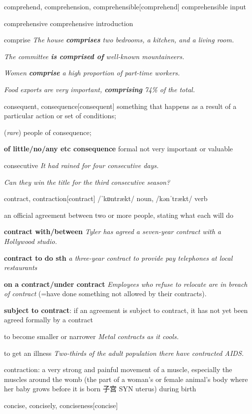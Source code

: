 \begin{word}{comprehend, comprehension, comprehensible}[comprehend]
    comprehensible input
\end{word}

\begin{word}{comprehensive}
    comprehensive introduction
\end{word}

\begin{word}{comprise}
    \textit{The house \textbf{comprises} two bedrooms, a kitchen, and a living room.} 
    
    \textit{The committee \textbf{is comprised of} well-known mountaineers. }
    
    \textit{Women \textbf{comprise} a high proportion of part-time workers.} 
    
    \textit{Food exports are very important, \textbf{comprising} 74\% of the total.}
\end{word}

\begin{word}{consequent, consequence}[consequent]
    something that happens as a result of a particular action or set of conditions; 
    
    (\textit{rare}) people of consequence; 
    
    \textbf{of little/no/any etc consequence} formal not very important or valuable
\end{word}

\begin{word}{consecutive}
   \textit{ It had rained for four consecutive days.}

    \textit{Can they win the title for the third consecutive season?}
\end{word}

\begin{word}{contract, contraction}[contract]
    /ˈkɒntrækt/ noun, /kənˈtrækt/ verb

    an official agreement between two or more people, stating what each will do

    \textbf{contract with/between}
    \textit{Tyler has agreed a seven-year contract with a Hollywood studio.}

    \textbf{contract to do sth}
    \textit{a three-year contract to provide pay telephones at local restaurants}

    \textbf{on a contract/under contract}
    \textit{Employees who refuse to relocate are in breach of contract} (=have done something not allowed by their contracts).


    \textbf{subject to contract}: if an agreement is subject to contract, it has not yet been agreed formally by a contract

    to become smaller or narrower
    \textit{Metal contracts as it cools.}

    to get an illness
    \textit{Two-thirds of the adult population there have contracted AIDS.}

    contraction: a very strong and painful movement of a muscle, especially the muscles around the womb (the part of a woman's or female animal's body where her baby grows before it is born 子宫 SYN  uterus) during birth
\end{word}

\begin{word}{concise, concisely, conciseness}[concise] 
\end{word}